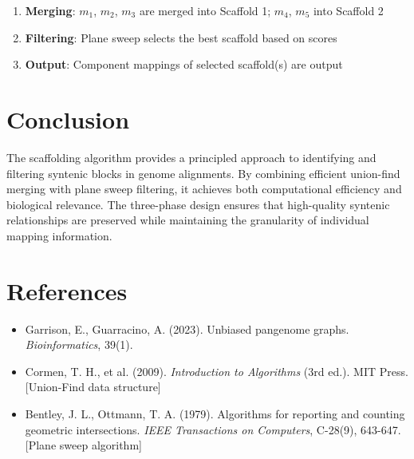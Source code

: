 \documentclass[11pt]{article}
\begin{document}
\begin{enumerate}
    \item \textbf{Merging}: $m_1$, $m_2$, $m_3$ are merged into Scaffold 1; $m_4$, $m_5$ into Scaffold 2
    \item \textbf{Filtering}: Plane sweep selects the best scaffold based on scores
    \item \textbf{Output}: Component mappings of selected scaffold(s) are output
\end{enumerate}

\section{Conclusion}

The scaffolding algorithm provides a principled approach to identifying and filtering syntenic blocks in genome alignments. By combining efficient union-find merging with plane sweep filtering, it achieves both computational efficiency and biological relevance. The three-phase design ensures that high-quality syntenic relationships are preserved while maintaining the granularity of individual mapping information.

\section{References}

\begin{itemize}
    \item Garrison, E., Guarracino, A. (2023). Unbiased pangenome graphs. \textit{Bioinformatics}, 39(1).
    \item Cormen, T. H., et al. (2009). \textit{Introduction to Algorithms} (3rd ed.). MIT Press. [Union-Find data structure]
    \item Bentley, J. L., Ottmann, T. A. (1979). Algorithms for reporting and counting geometric intersections. \textit{IEEE Transactions on Computers}, C-28(9), 643-647. [Plane sweep algorithm]
\end{itemize}
\end{document}
